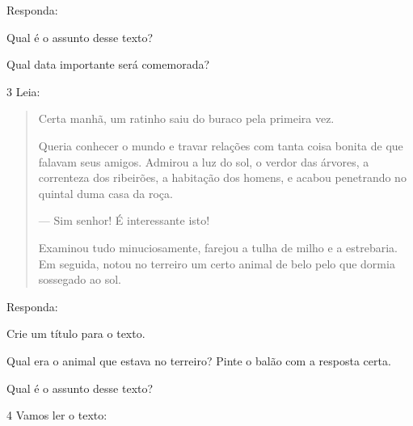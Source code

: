 Responda:

\begin{escolha}
\item Qual é o assunto desse texto?


\item Qual data importante será comemorada?

\end{escolha}

\num{3} Leia:


\begin{quote}
Certa manhã, um ratinho saiu do buraco pela primeira vez.

Queria conhecer o mundo e travar relações com tanta coisa bonita de que
falavam seus amigos. Admirou a luz do sol, o verdor das árvores, a
correnteza dos ribeirões, a habitação dos homens, e acabou penetrando no
quintal duma casa da roça.

--- Sim senhor! É interessante isto!

Examinou tudo minuciosamente, farejou a tulha de milho e a estrebaria.
Em seguida, notou no terreiro um certo animal de belo pelo que dormia
sossegado ao sol.

\end{quote}

Responda:

\begin{escolha}
\item Crie um título para o texto.


\item Qual era o animal que estava no terreiro? Pinte o balão com a resposta certa.

\item Qual é o assunto desse texto?

\end{escolha}

\num{4} Vamos ler o texto:


